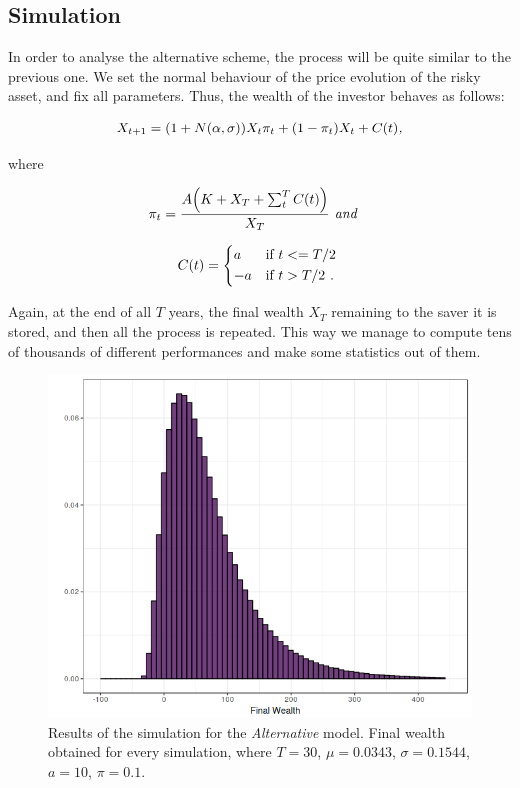 \subsection*{Simulation}

In order to analyse the alternative scheme, the process will be quite similar to the previous one. We set the normal behaviour of the price evolution of the risky asset, and fix all parameters. Thus, the wealth of the investor behaves as follows:

\begin{align}
    X_{t+1} = \qty(1+N(\alpha, \sigma))X_t \pi_t + \qty(1 - \pi_t)X_t + C(t) \textit{,}
\end{align}

where

\begin{align}
    \pi_t = \frac{A\qty(K + X_T + \sum_t^T C(t))}{X_T} & \textit{                           and}
\end{align}

\begin{equation*}
    C(t) =
    \begin{cases*}
      a & if $t <= T/2$ \\
      -a       & if $t > T/2$ \textit{.}
    \end{cases*}
\end{equation*}

Again, at the end of all $T$ years, the final wealth $X_T$ remaining to the saver it is stored, and then all the process is repeated. This way we manage to compute tens of thousands of different performances and make some statistics out of them.

\begin{figure}[H]
    \centering
    \includegraphics[scale=0.65]{./images/fw_alt.png}
    \caption{Results of the simulation for the \textit{Alternative} model. Final wealth obtained for every simulation, where $T=30$, $\mu = 0.0343$, $\sigma = 0.1544$, $a=10$, $\pi = 0.1$.}
    \label{fig:alt_fw}
\end{figure}

